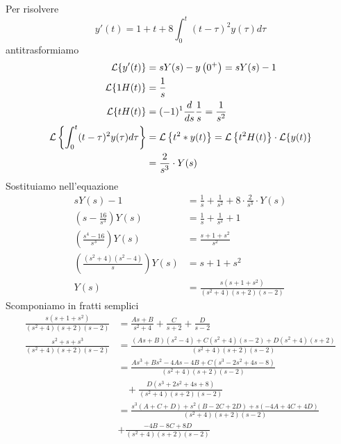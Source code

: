 Per risolvere
\begin{equation*}
y'(t) = 1 + t + 8\int ^{t}_{0}(t - \tau)^{2} y(\tau) d\tau 
\end{equation*}
antitrasformiamo
\begin{align*}
\mathcal{L}\{y'(t)\} & = sY(s) - y\left(0^{ + }\right) = sY(s) - 1\\
\mathcal{L}\{1H(t)\} & = \frac{1}{s}\\
\mathcal{L}\{tH(t)\} & = (- 1)^{1}\frac{d}{ds}\frac{1}{s} = \frac{1}{s^{2}}\\
\mathcal{L}\left\{\int ^{t}_{0}(t - \tau)^{2} y(\tau) d\tau \right\} & = \mathcal{L}\left\{t^{2} *y(t)\right\} = \mathcal{L}\left\{t^{2} H(t)\right\} \cdot \mathcal{L}\{y(t)\}\\
 & = \frac{2}{s^{3}} \cdot Y(s)
\end{align*}
Sostituiamo nell'equazione
\begin{align*}
sY(s) - 1 & = \frac{1}{s} + \frac{1}{s^{2}} + 8\cdot \frac{2}{s^{3}} \cdot Y(s)\\
\left(s - \frac{16}{s^{3}}\right) Y(s) & = \frac{1}{s} + \frac{1}{s^{2}} + 1\\
\left(\frac{s^{4} - 16}{s^{3}}\right) Y(s) & = \frac{s + 1 + s^{2}}{s^{2}}\\
\left(\frac{\left(s^{2} + 4\right)\left(s^{2} - 4\right)}{s}\right) Y(s) & = s + 1 + s^{2}\\
Y(s) & = \frac{s\left(s + 1 + s^{2}\right)}{\left(s^{2} + 4\right)(s + 2)(s - 2)}
\end{align*}
Scomponiamo in fratti semplici
\begin{align*}
\frac{s\left(s + 1 + s^{2}\right)}{\left(s^{2} + 4\right)(s + 2)(s - 2)} & = \frac{As + B}{s^{2} + 4} + \frac{C}{s + 2} + \frac{D}{s - 2}\\
\frac{s^{2} + s + s^{3}}{\left(s^{2} + 4\right)(s + 2)(s - 2)} & = \frac{(As + B)\left(s^{2} - 4\right) + C\left(s^{2} + 4\right)(s - 2) + D\left(s^{2} + 4\right)(s + 2)}{\left(s^{2} + 4\right)(s + 2)(s - 2)}\\
 & = \frac{As^{3} + Bs^{2} - 4As - 4B + C\left(s^{3} - 2s^{2} + 4s - 8\right)}{\left(s^{2} + 4\right)(s + 2)(s - 2)}\\
 & \ \ \ \ + \frac{D\left(s^{3} + 2s^{2} + 4s + 8\right)}{\left(s^{2} + 4\right)(s + 2)(s - 2)}\\
 & = \frac{s^{3}(A + C + D) + s^{2}(B - 2C + 2D) + s(- 4A + 4C + 4D)}{\left(s^{2} + 4\right)(s + 2)(s - 2)}\\
 & + \frac{ - 4B - 8C + 8D}{\left(s^{2} + 4\right)(s + 2)(s - 2)}
\end{align*}
